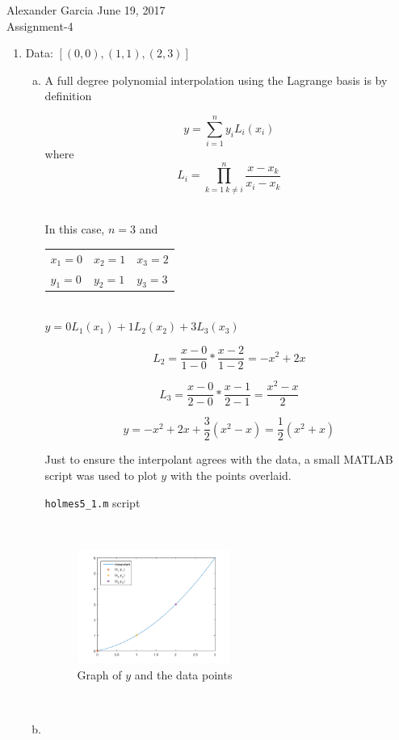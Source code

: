 \documentclass[11pt]{article}
\begin{document}
\lstset{stringstyle=\ttfamily,
	showstringspaces=false,
	basicstyle=\small}

\begin{center} Alexander Garcia \hfill June 19, 2017 \\ Assignment-4 \end{center}

\medskip

\begin{enumerate}

	\item Data: $[(0,0),(1,1),(2,3)]$

		\begin{enumerate}[(a)]

			\item A full degree polynomial interpolation using the Lagrange basis is by definition

			\[
				y = \sum_{i = 1}^{n} y_i L_i(x_i)
			\]
			where
			\[
				L_i = \prod_{k = 1\ k \neq i}^{n} \frac{x-x_k}{x_i-x_k}
			\] \

			In this case, $n=3$ and

			\begin{tabular}{lll}
				$x_1 = 0$ & $x_2 = 1$ & $x_3 = 2$ \\
				$y_1 = 0$ & $y_2 = 1$ & $y_3 = 3$ \\
			\end{tabular} \\

			$y = 0L_1(x_1) + 1L_2(x_2) + 3L_3(x_3)$

			\[
				L_2 = \frac{x-0}{1-0} * \frac{x-2}{1-2}
				= -x^2 + 2x
			\]

			\[
				L_3 = \frac{x-0}{2-0} * \frac{x-1}{2-1}
				= \frac{x^2-x}{2}
			\]

			\[
				y = -x^2 + 2x + \frac{3}{2}(x^2-x) = \frac{1}{2}(x^2 + x)
			\]

			Just to ensure the interpolant agrees with the data, a small MATLAB script was used to plot $y$ with the points
			overlaid.

			\begin{center}
				\texttt{holmes5\_1.m} script
			\end{center}
			 \

			\begin{figure}[H]
				\centering
				\includegraphics[width=0.5\textwidth]{holmes5_1.png}
				\caption{Graph of $y$ and the data points}
			\end{figure} \

			\item

		\end{enumerate}

\end{enumerate}
\end{document}
